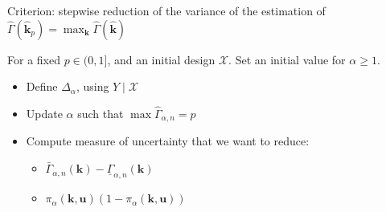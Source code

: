 \documentclass[a4paper,11pt]{article}
\begin{document}
Criterion: stepwise reduction of the variance of the estimation of $\hat{\Gamma}(\hat{\mathbf{k}}_p) = \max_{\mathbf{k}}\hat{\Gamma}(\hat{\mathbf{k}})$

For a fixed $p\in (0, 1]$, and an initial design $\mathcal{X}$. Set an initial value for $\alpha \geq 1$. 
\begin{itemize}
\item Define $\Delta_{\alpha}$, using $Y \mid \mathcal{X}$
\item Update $\alpha$ such that $\max \hat{\Gamma}_{\alpha,n} = p$
\item Compute measure of uncertainty that we want to reduce:
  \begin{itemize}
  \item $\bar{\Gamma}_{\alpha,n}(\mathbf{k}) - \underline{\Gamma}_{\alpha,n}(\mathbf{k})$
  \item $\pi_{\alpha}(\mathbf{k},\mathbf{u})(1-\pi_{\alpha}(\mathbf{k},\mathbf{u}))$
  \end{itemize}
\end{itemize}





\end{document}
